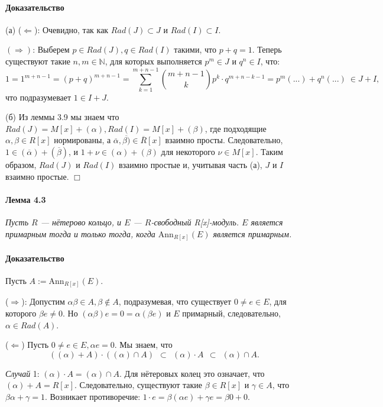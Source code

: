 \documentclass[a4paper,12pt]{article}
\newcommand{\Ann}{\text{Ann}}
\begin{document}
\paragraph{Доказательство}
(а) ($\Leftarrow$): Очевидно, так как $Rad(J) \subset J$ и $Rad(I) \subset I$.

$(\Rightarrow)$: Выберем $p \in Rad(J), q \in Rad(I)$ такими, что $p + q = 1$. Теперь существуют такие $n, m \in \mathbb{N}$, для которых выполняется $p^m \in J$ и $q^n \in I$, что:
$$
1 = 1^{m+n-1} = (p + q)^{m+n-1} = \sum_{k=1}^{m+n-1} \binom{m+n-1}{k}p^k \cdot q^{m+n-k-1} = p^m (...) + q^n (...) ~ \in J+I,
$$
что подразумевает $1 \in I+J$.

(б) Из леммы 3.9 мы знаем что $Rad(J) = M[x] + (\alpha), Rad(I) = M[x]+(\beta)$, где подходящие $\alpha, \beta \in R[x]$ нормированы, а $\overline{\alpha}, \overline{\beta)} \in \overline{R}[x]$ взаимно просты. Следовательно, $1 \in (\overline{\alpha}) + (\overline{\beta})$, и $1 + \nu \in (\alpha) + (\beta)$ для некоторого $\nu \in M[x]$. Таким образом, $Rad(J)$ и $Rad(I)$ взаимно простые и, учитывая часть (а), $J$ и $I$ взаимно простые.
$\Box$

\paragraph{Лемма 4.3}
{\itshape
Пусть $R$ --- нётерово кольцо, и $E$ --- $R$-свободный R[x]-модуль. $E$ является примарным тогда и только тогда, когда $\Ann_{R[x]}(E)$ является примарным.
}

\paragraph{Доказательство}
Пусть $A := \Ann_{R[x]}(E)$.

($\Rightarrow$): Допустим $\alpha \beta \in A, \beta \notin A$, подразумевая, что существует $0 \ne e \in E$, для которого $\beta e \ne 0$. Но $(\alpha \beta)e = 0 = \alpha (\beta e)$ и $E$ примарный, следовательно, $\alpha \in Rad(A)$.

($\Leftarrow$) Пусть $0 \ne e \in E, \alpha e = 0$. Мы знаем, что
$$((\alpha)+A) \cdot ((\alpha) \cap A) ~~ \subset ~~ (\alpha) \cdot A ~~ \subset ~~ (\alpha) \cap A.$$

\textit{Случай} 1: $(\alpha) \cdot A = (\alpha) \cap A$. Для нётеровых колец это означает, что $(\alpha) + A = R[x]$. Следовательно, существуют такие $\beta \in R[x]$ и $\gamma \in A$, что $\beta \alpha + \gamma = 1$. Возникает противоречие: $1 \cdot e = \beta (\alpha e) + \gamma e = \beta 0 + 0$. 
\end{document}
